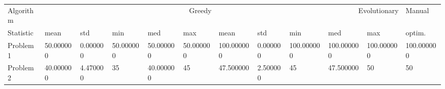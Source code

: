 \begin{tabular}{llllllllllll}
\toprule
Algorithm & \multicolumn{5}{r}{Greedy} & \multicolumn{5}{r}{Evolutionary} & Manual \\
Statistic & mean & std & min & med & max & mean & std & min & med & max & optim. \\
\midrule
Problem 1 & 50.000000 & 0.000000 & 50.000000 & 50.000000 & 50.000000 & 100.000000 & 0.000000 & 100.000000 & 100.000000 & 100.000000 & 100.000000 \\
Problem 2 & 40.000000 & 4.470000 & 35 & 40.000000 & 45 & 47.500000 & 2.500000 & 45 & 47.500000 & 50 & 50 \\
\bottomrule
\end{tabular}
